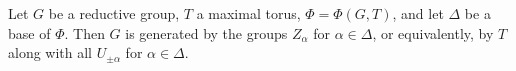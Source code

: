 Let $G$ be a reductive group, $T$ a maximal torus, $\Phi = \Phi(G, T)$, and let $\Delta$ be a base of $\Phi$. Then $G$ is generated by the groups $Z_\alpha$ for $\alpha \in \Delta$, or equivalently, by $T$ along with all $U_{\pm\alpha}$ for $\alpha \in \Delta$.
